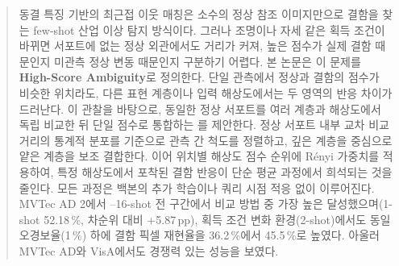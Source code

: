 \begin{abstract}
동결 특징 기반의 최근접 이웃 매칭은 소수의 정상 참조 이미지만으로 결함을 찾는 few-shot 산업 이상 탐지 방식이다.
그러나 조명이나 자세 같은 획득 조건이 바뀌면 서포트에 없는 정상 외관에서도 거리가 커져, 높은 점수가 실제 결함 때문인지 미관측 정상 변동 때문인지 구분하기 어렵다.
본 논문은 이 문제를 \textbf{High-Score Ambiguity}로 정의한다.
단일 관측에서 정상과 결함의 점수가 비슷한 위치라도, 다른 표현 계층이나 입력 해상도에서는 두 영역의 반응 차이가 드러난다.
이 관찰을 바탕으로, 동일한 정상 서포트를 여러 계층과 해상도에서 독립 비교한 뒤 단일 점수로 통합하는 \textbf{\method}를 제안한다.
 정상 서포트 내부 교차 비교 거리의 통계적 분포를 기준으로 관측 간 척도를 정렬하고, 깊은 계층을 중심으로 얕은 계층을 보조 결합한다.
이어 위치별 해상도 점수 순위에 Rényi 가중치를 적용하여, 특정 해상도에서 포착된 결함 반응이 단순 평균 과정에서 희석되는 것을 줄인다.
모든 과정은 백본의 추가 학습이나 쿼리 시점 적응 없이 이루어진다.
MVTec AD 2에서 --16-shot 전 구간에서 비교 방법 중 가장 높은  달성했으며(1-shot 52.18\,\%, 차순위 대비 +5.87\,pp), 획득 조건 변화 환경(2-shot)에서도 동일 오경보율(1\,\%) 하에 결함 픽셀 재현율을 36.2\,\%에서 45.5\,\%로 높였다.
아울러 MVTec AD와 VisA에서도 경쟁력 있는 성능을 보였다.
\end{abstract}
